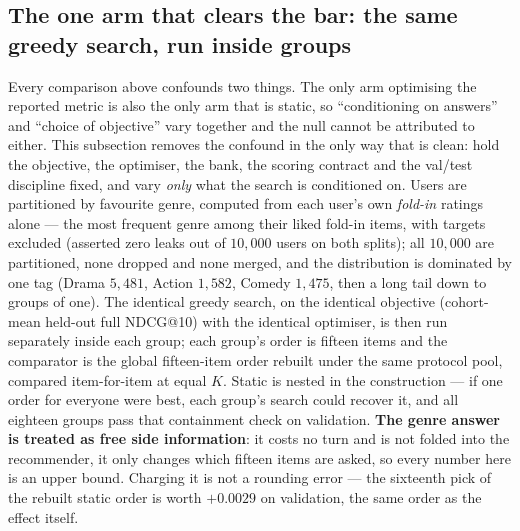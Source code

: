 \documentclass[11pt]{article}
\begin{document}
\subsection{The one arm that clears the bar: the same greedy search, run inside groups}
\label{sec:groupgreedy}

Every comparison above confounds two things. The only arm optimising the reported metric is also the
only arm that is static, so ``conditioning on answers'' and ``choice of objective'' vary together and
the null cannot be attributed to either. This subsection removes the confound in the only way that is
clean: hold the objective, the optimiser, the bank, the scoring contract and the val/test discipline
fixed, and vary \emph{only} what the search is conditioned on. Users are partitioned by favourite
genre, computed from each user's own \emph{fold-in} ratings alone --- the most frequent genre among
their liked fold-in items, with targets excluded (asserted zero leaks out of $10{,}000$ users on both
splits); all $10{,}000$ are partitioned, none dropped and none merged, and the distribution is
dominated by one tag (Drama $5{,}481$, Action $1{,}582$, Comedy $1{,}475$, then a long tail down to
groups of one). The identical greedy search, on the identical objective (cohort-mean held-out full
NDCG@10) with the identical optimiser, is then run separately inside each group; each group's order
is fifteen items and the comparator is the global fifteen-item order rebuilt under the same
protocol pool, compared item-for-item at equal $K$. Static is nested in the construction --- if one
order for everyone were best, each group's search could recover it, and all eighteen groups pass that
containment check on validation. \textbf{The genre answer is treated as free side information}: it
costs no turn and is not folded into the recommender, it only changes which fifteen items are asked,
so every number here is an upper bound. Charging it is not a rounding error --- the sixteenth pick of
the rebuilt static order is worth $+0.0029$ on validation, the same order as the effect itself.
\end{document}
